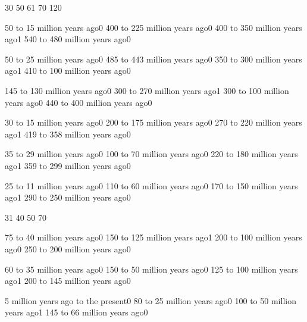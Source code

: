 {3}{0}
{5}{0}
{6}{1}
{7}{0}
{12}{0}
\qstop

{50 to 15 million years ago}{0}
{400 to 225 million years ago}{0}
{400 to 350 million years ago}{1}
{540 to 480 million years ago}{0}
\qstop

{50 to 25 million years ago}{0}
{485 to 443 million years ago}{0}
{350 to 300 million years ago}{1}
{410 to 100 million years ago}{0}
\qstop

{145 to 130 million years ago}{0}
{300 to 270 million years ago}{1}
{300 to 100 million years ago}{0}
{440 to 400 million years ago}{0}
\qstop

{30 to 15 million years ago}{0}
{200 to 175 million years ago}{0}
{270 to 220 million years ago}{1}
{419 to 358 million years ago}{0}
\qstop

{35 to 29 million years ago}{0}
{100 to 70 million years ago}{0}
{220 to 180 million years ago}{1}
{359 to 299 million years ago}{0}
\qstop

{25 to 11 million years ago}{0}
{110 to 60 million years ago}{0}
{170 to 150 million years ago}{1}
{290 to 250 million years ago}{0}
\qstop

{3}{1}
{4}{0}
{5}{0}
{7}{0}
\qstop

{75 to 40 million years ago}{0}
{150 to 125 million years ago}{1}
{200 to 100 million years ago}{0}
{250 to 200 million years ago}{0}
\qstop

{60 to 35 million years ago}{0}
{150 to 50 million years ago}{0}
{125 to 100 million years ago}{1}
{200 to 145 million years ago}{0}
\qstop

{5 million years ago to the present}{0}
{80 to 25 million years ago}{0}
{100 to 50 million years ago}{1}
{145 to 66 million years ago}{0}
\qstop

